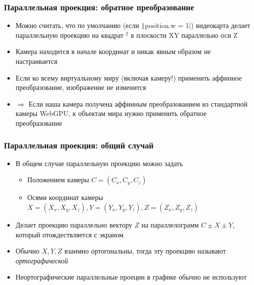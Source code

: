 \documentclass[10pt]{beamer}
\begin{document}
\begin{frame}[fragile]
\frametitle{Параллельная проекция: обратное преобразование}
\begin{itemize}
\item Можно считать, что по умолчанию (если \texttt|position.w = 1|) видеокарта делает параллельную проекцию на квадрат \begin{math}[-1, 1]^2\end{math} в плоскости XY параллельно оси Z
\pause
\item Камера находится в начале координат и никак явным образом не настраивается
\pause
\item Если ко всему виртуальному миру (включая камеру!) применить аффинное преобразование, изображение не изменится
\pause
\item \begin{math}\Longrightarrow\end{math} Если наша камера получена аффинным преобразованием из стандартной камеры WebGPU, к объектам мира нужно применить обратное преобразование
\end{itemize}
\end{frame}

\begin{frame}[fragile]
\frametitle{Параллельная проекция: общий случай}
\begin{itemize}
\item В общем случае параллельную проекцию можно задать
\pause
\begin{itemize}
\item Положением камеры \begin{math}C = (C_x, C_y, C_z)\end{math}
\pause
\item Осями координат камеры \begin{math}X = (X_x, X_y, X_z), Y = (Y_x, Y_y, Y_z), Z = (Z_x, Z_y, Z_z)\end{math}
\end{itemize}
\pause
\item Делает проекцию параллельно вектору \begin{math}Z\end{math} на параллелограмм \begin{math}C \pm X \pm Y\end{math}, который отождествляется с экраном
\pause
\item Обычно \begin{math}X, Y, Z\end{math} взаимно ортогональны, тогда эту проекцию называют \textit{ортографической}
\pause
\item Неортографические параллельные проеции в графике обычно не используют
\end{itemize}
\end{frame}
\end{document}
